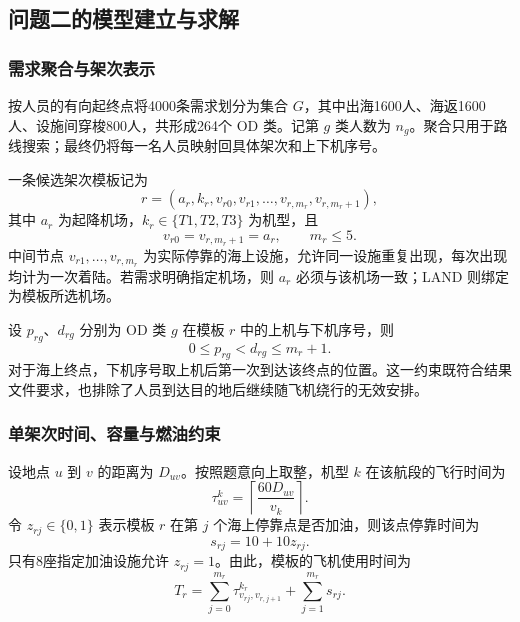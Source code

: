 \documentclass[UTF-8,a4paper,zihao=-4]{ctexart}
\begin{document}
\subsection{问题二的模型建立与求解}
\subsubsection{需求聚合与架次表示}

按人员的有向起终点将4000条需求划分为集合 $G$，其中出海1600人、海返1600人、设施间穿梭800人，共形成264个 OD 类。记第 $g$ 类人数为 $n_g$。聚合只用于路线搜索；最终仍将每一名人员映射回具体架次和上下机序号。

一条候选架次模板记为
\begin{equation}
 r=\left(a_r,k_r,v_{r0},v_{r1},\ldots,v_{r,m_r},v_{r,m_r+1}\right),
\end{equation}
其中 $a_r$ 为起降机场，$k_r\in\{T1,T2,T3\}$ 为机型，且
\begin{equation}
 v_{r0}=v_{r,m_r+1}=a_r,\qquad m_r\leq 5.
\end{equation}
中间节点 $v_{r1},\ldots,v_{r,m_r}$ 为实际停靠的海上设施，允许同一设施重复出现，每次出现均计为一次着陆。若需求明确指定机场，则 $a_r$ 必须与该机场一致；LAND 则绑定为模板所选机场。

设 $p_{rg}$、$d_{rg}$ 分别为 OD 类 $g$ 在模板 $r$ 中的上机与下机序号，则
\begin{equation}
 0\leq p_{rg}<d_{rg}\leq m_r+1.
\end{equation}
对于海上终点，下机序号取上机后第一次到达该终点的位置。这一约束既符合结果文件要求，也排除了人员到达目的地后继续随飞机绕行的无效安排。

\subsubsection{单架次时间、容量与燃油约束}

设地点 $u$ 到 $v$ 的距离为 $D_{uv}$。按照题意向上取整，机型 $k$ 在该航段的飞行时间为
\begin{equation}
 \tau_{uv}^{k}=\left\lceil\frac{60D_{uv}}{v_k}\right\rceil .
\end{equation}
令 $z_{rj}\in\{0,1\}$ 表示模板 $r$ 在第 $j$ 个海上停靠点是否加油，则该点停靠时间为
\begin{equation}
 s_{rj}=10+10z_{rj}.
\end{equation}
只有8座指定加油设施允许 $z_{rj}=1$。由此，模板的飞机使用时间为
\begin{equation}
 T_r=\sum_{j=0}^{m_r}\tau_{v_{rj},v_{r,j+1}}^{k_r}
     +\sum_{j=1}^{m_r}s_{rj}.
\end{equation}
\end{document}
